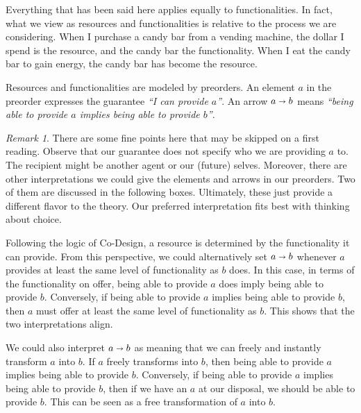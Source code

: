 \documentclass[12pt]{article}
\theoremstyle{definition}
\theoremstyle{plain}
\theoremstyle{plain}
\theoremstyle{plain}
\theoremstyle{plain}
\theoremstyle{remark}
\theoremstyle{remark}
\newtheorem{remark}[definition]{Remark}
\begin{document}
Everything that has been said here applies equally to functionalities. In fact, what we view as resources and functionalities is relative to the process we are considering. When I purchase a candy bar from a vending machine, the dollar I spend is the resource, and the candy bar the functionality. When I eat the candy bar to gain energy, the candy bar has become the resource.

\begin{tcolorbox}[title=Resources and Functionalities, colframe=Apricot, colback = paleorange, coltitle = Sepia]
	Resources and functionalities are modeled by preorders. An element $a$ in the preorder expresses the guarantee \emph{``I can provide $a$''}. An arrow $a \shortrightarrow b$ means \emph{``being able to provide $a$ implies being able to provide $b$''}. 
\end{tcolorbox}

\begin{remark}
	There are some fine points here that may be skipped on a first reading. Observe that our guarantee does not specify who we are providing $a$ to. The recipient might be another agent or our (future) selves. Moreover, there are other interpretations we could give the elements and arrows in our preorders. Two of them are discussed in the following boxes. Ultimately, these just provide a different flavor to the theory. Our preferred interpretation fits best with thinking about choice.
\end{remark}

\begin{tcolorbox}[title= Functionality Interpretation]
	 Following the logic of Co-Design, a resource is determined by the functionality it can provide. From this perspective, we could alternatively set $a \shortrightarrow b$ whenever $a$ provides at least the same level of functionality as $b$ does. In this case, in terms of the functionality on offer, being able to provide $a$ does imply being able to provide $b$. Conversely, if being able to provide $a$ implies being able to provide $b$, then $a$ must offer at least the same level of functionality as $b$. This shows that the two interpretations align.
\end{tcolorbox}

\begin{tcolorbox}[title= Transformation Interpretation]
	We could also interpret $a \shortrightarrow b$ as meaning that we can freely and instantly transform $a$ into $b$. If $a$ freely transforms into $b$, then being able to provide $a$ implies being able to provide $b$. Conversely, if being able to provide $a$ implies being able to provide $b$, then if we have an $a$ at our disposal, we should be able to provide $b$. This can be seen as a free transformation of $a$ into $b$.
\end{tcolorbox}
\end{document}
